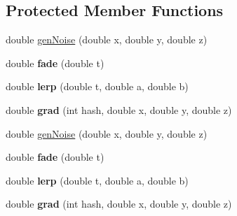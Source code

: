 \subsection*{Protected Member Functions}
\begin{DoxyCompactItemize}
\item 
double \hyperlink{classPUNoise3D_a16c5a5e589aa77780a872dd460dd9e79}{gen\+Noise} (double x, double y, double z)
\item 
\mbox{\label{classPUNoise3D_a029cb4c0d4eb1e87c727ef0a8633a226}} 
double {\bfseries fade} (double t)
\item 
\mbox{\label{classPUNoise3D_a74ad27805d92f8334678bc56122e7833}} 
double {\bfseries lerp} (double t, double a, double b)
\item 
\mbox{\label{classPUNoise3D_ad32079c2780e06916493bbb9b6e2e2a1}} 
double {\bfseries grad} (int hash, double x, double y, double z)
\item 
double \hyperlink{classPUNoise3D_a16c5a5e589aa77780a872dd460dd9e79}{gen\+Noise} (double x, double y, double z)
\item 
\mbox{\label{classPUNoise3D_a029cb4c0d4eb1e87c727ef0a8633a226}} 
double {\bfseries fade} (double t)
\item 
\mbox{\label{classPUNoise3D_a74ad27805d92f8334678bc56122e7833}} 
double {\bfseries lerp} (double t, double a, double b)
\item 
\mbox{\label{classPUNoise3D_ad32079c2780e06916493bbb9b6e2e2a1}} 
double {\bfseries grad} (int hash, double x, double y, double z)
\end{DoxyCompactItemize}
